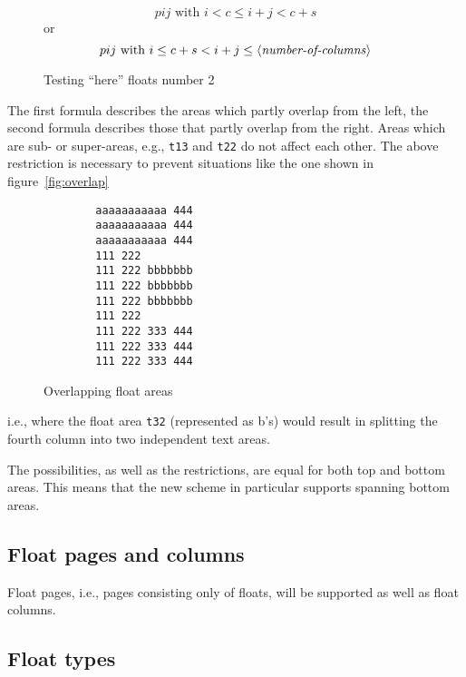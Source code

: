 \documentclass[twocolumn]{article}
\newcommand\meta[1]{\mbox{$\langle$\textit{#1}$\rangle$}}
\begin{document}
\begin{figure}[h]
\begin{minipage}{\columnwidth}
\vspace*{-2\baselineskip}
\tiny %
\[
   pij  \textrm{ with }   i < c \leq i+j < c+s
\]
or
\[
   pij  \textrm{ with }   i \leq c+s < i+j \leq 
                            \mbox{\meta{number-of-columns}}
\]
\end{minipage}
\caption{Testing ``here'' floats number 2}
\end{figure}

The first formula describes the areas which partly overlap from the
left, the second formula describes those that partly overlap from
the right. Areas which are sub- or super-areas, e.g., \texttt{t13}
and \texttt{t22} do not affect each other. The above restriction is
necessary to prevent situations like the one shown in
figure~\vref{fig:overlap}
%
\begin{figure}
\footnotesize
\caption{Overlapping float areas}\label{fig:overlap}
\begin{minipage}{.6\columnwidth}
\begin{verbatim}
        aaaaaaaaaaa 444
        aaaaaaaaaaa 444
        aaaaaaaaaaa 444
        111 222
        111 222 bbbbbbb
        111 222 bbbbbbb
        111 222 bbbbbbb
        111 222
        111 222 333 444
        111 222 333 444
        111 222 333 444
\end{verbatim}
\end{minipage}
\end{figure}
%
i.e., where the float area \texttt{t32} (represented as b's) would
result in splitting the fourth column into two independent text areas.


The possibilities, as well as the restrictions, are equal for both top
and bottom areas. This means that the new scheme in particular
supports spanning bottom areas.


\subsection{Float pages and columns}

Float pages, i.e., pages consisting only of floats, will be supported
as well as float columns.


\subsection{Float types}
\end{document}
